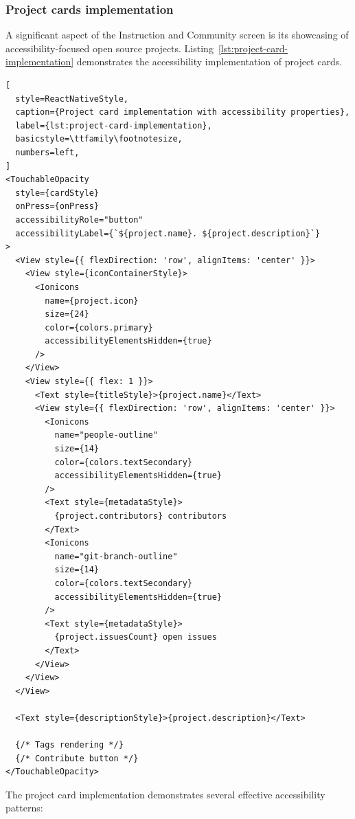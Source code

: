 \subsubsection{Project cards implementation}

A significant aspect of the Instruction and Community screen is its showcasing of accessibility-focused open source projects. Listing~\ref{lst:project-card-implementation} demonstrates the accessibility implementation of project cards.

\begin{lstlisting}[
  style=ReactNativeStyle,
  caption={Project card implementation with accessibility properties},
  label={lst:project-card-implementation},
  basicstyle=\ttfamily\footnotesize,
  numbers=left,
]
<TouchableOpacity
  style={cardStyle}
  onPress={onPress}
  accessibilityRole="button"
  accessibilityLabel={`${project.name}. ${project.description}`}
>
  <View style={{ flexDirection: 'row', alignItems: 'center' }}>
    <View style={iconContainerStyle}>
      <Ionicons 
        name={project.icon} 
        size={24} 
        color={colors.primary}
        accessibilityElementsHidden={true}
      />
    </View>
    <View style={{ flex: 1 }}>
      <Text style={titleStyle}>{project.name}</Text>
      <View style={{ flexDirection: 'row', alignItems: 'center' }}>
        <Ionicons 
          name="people-outline" 
          size={14} 
          color={colors.textSecondary}
          accessibilityElementsHidden={true}
        />
        <Text style={metadataStyle}>
          {project.contributors} contributors
        </Text>
        <Ionicons 
          name="git-branch-outline" 
          size={14} 
          color={colors.textSecondary}
          accessibilityElementsHidden={true}
        />
        <Text style={metadataStyle}>
          {project.issuesCount} open issues
        </Text>
      </View>
    </View>
  </View>
  
  <Text style={descriptionStyle}>{project.description}</Text>
  
  {/* Tags rendering */}
  {/* Contribute button */}
</TouchableOpacity>
\end{lstlisting}

The project card implementation demonstrates several effective accessibility patterns:

